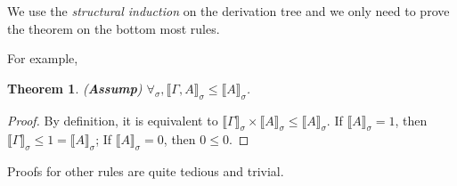 \documentclass{article}
\newtheorem{theorem}{Theorem}[section]
\newcommand{\brs}[1]{\llbracket#1\rrbracket_\sigma}
\begin{document}
We use the \emph{structural induction} on the derivation tree and we only need to prove the theorem on the bottom most rules.

For example,

\begin{theorem}
    (\textbf{Assump}) $\forall_\sigma, \brs{\Gamma, A} \leq \brs{A}$.
\end{theorem}

\begin{proof}
    By definition, it is equivalent to $\brs{\Gamma} \times \brs{A} \leq \brs{A}$.
    If $\brs{A} = 1$, then $\brs{\Gamma}\leq 1 = \brs{A}$;
    If $\brs{A} = 0$, then $0\leq 0$.
\end{proof}

Proofs for other rules are quite tedious and trivial.








\end{document}
